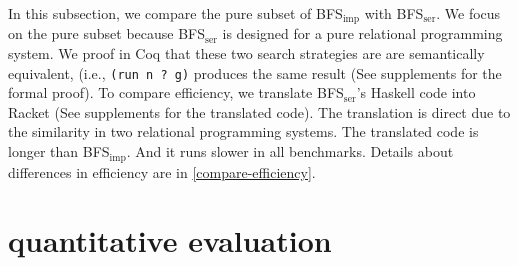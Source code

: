 \documentclass[format=acmlarge, review=true, authordraft=true]{acmart}
\newcommand{\BFSser}[0]{BFS$_\textrm{ser}$}
\newcommand{\BFSimp}[0]{BFS$_\textrm{imp}$}
\begin{document}
In this subsection, we compare the pure subset of \BFSimp{} with \BFSser{}. We 
focus on the pure subset because \BFSser{} is designed for a pure 
relational programming system. We proof in Coq that these two search strategies 
are are semantically equivalent, (i.e., \texttt{(run n ? g)} produces the same 
result (See supplements for the formal proof). To compare efficiency, we 
translate \BFSser{}'s Haskell code into Racket (See supplements for the 
translated code). The translation is direct due to the similarity in two 
relational programming systems. The translated code is longer than \BFSimp{}. 
And it runs slower in all benchmarks. Details about differences in efficiency 
are in \autoref{compare-efficiency}.

\section{quantitative evaluation}
\end{document}

